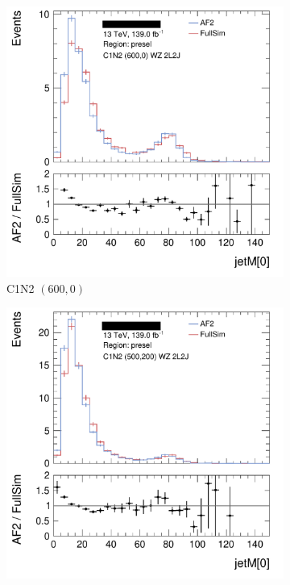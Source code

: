 \begin{figure}[tp]
\centering
\begin{subfigure}{0.48\textwidth}
\centering
\includegraphics[width=\textwidth]{figures/2ljets_C1N2_WZ_600_0_2L2J_presel_jetM[0]_26.png}
\caption{C1N2 $(600, 0)$}
\end{subfigure}
\hfill
\begin{subfigure}{0.48\textwidth}
\centering
\includegraphics[width=\textwidth]{figures/2ljets_C1N2_WZ_500p0_200p0_2L2J_presel_jetM[0]_38.png}

\end{subfigure}
\end{figure}
